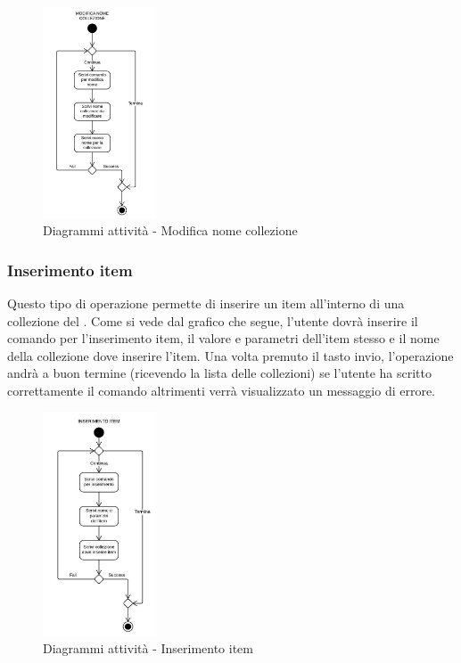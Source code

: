 \documentclass{scalatekids-article}
\begin{document}
\begin{figure}[H]
  \begin{center}
    \includegraphics[width=0.3\textwidth, keepaspectratio]{img/diagrammiAttivita/modNomeCollezione.jpeg}
    \caption{Diagrammi attività - Modifica nome collezione}
  \end{center}
\end{figure}

\subsubsection{Inserimento item}

Questo tipo di operazione permette di inserire un item all'interno di una
collezione del . Come si vede dal grafico che segue, l'utente dovrà
inserire il comando per l'inserimento item, il valore e parametri dell'item
stesso e il nome della collezione dove inserire l'item. Una volta premuto il
tasto invio, l'operazione andrà a buon termine (ricevendo la lista delle
collezioni) se l'utente ha scritto correttamente il comando altrimenti verrà
visualizzato un messaggio di errore.

\begin{figure}[H]
  \begin{center}
    \includegraphics[width=0.3\textwidth, keepaspectratio]{img/diagrammiAttivita/inserimentoItem.jpeg}
    \caption{Diagrammi attività - Inserimento item}
  \end{center}
\end{figure}
\end{document}
